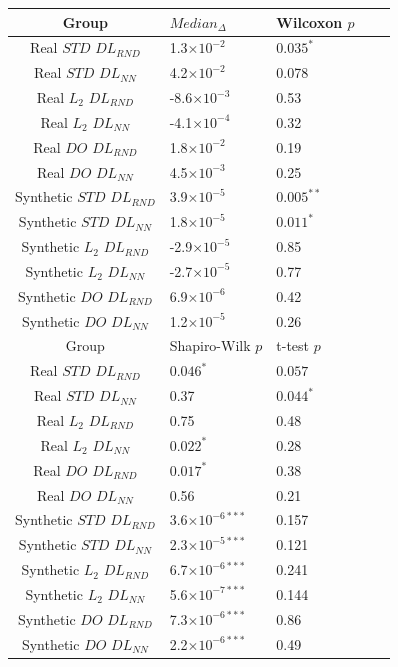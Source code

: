 \documentclass[conference]{IEEEtran}
\begin{document}
\begin{table}[h]
 \begin{center}
 \begin{small}
 \begin{sc}
 \begin{tabular}{c|llll}
 
 \toprule
 Group & $Median_{\Delta}$ & Wilcoxon $p$ \\
 
 \midrule
 Real $STD$ $DL_{RND}$ & 1.3$\times10^{-2}$ & $0.035^{*}$  \\
 Real $STD$ $DL_{NN}$ & 4.2$\times10^{-2}$ & 0.078 \\
 Real $L_2$ $DL_{RND}$ & -8.6$\times10^{-3}$ & 0.53  \\
 Real $L_2$ $DL_{NN}$ & -4.1$\times10^{-4}$ & 0.32  \\
 Real $DO$ $DL_{RND}$ & 1.8$\times10^{-2}$ & 0.19 \\
 Real $DO$ $DL_{NN}$ & 4.5$\times10^{-3}$ & 0.25 \\
 
 \hline
 Synthetic $STD$ $DL_{RND}$ & 3.9$\times10^{-5}$ & $0.005^{**}$ \\
 Synthetic $STD$ $DL_{NN}$ & 1.8$\times10^{-5}$ & $0.011^{*}$  \\
 Synthetic $L_2$ $DL_{RND}$ & -2.9$\times10^{-5}$ & 0.85 \\
 Synthetic $L_2$ $DL_{NN}$ & -2.7$\times10^{-5}$ & 0.77 \\
 Synthetic $DO$ $DL_{RND}$ & 6.9$\times10^{-6}$ & 0.42  \\
 Synthetic $DO$ $DL_{NN}$ & 1.2$\times10^{-5}$ & 0.26  \\
 
 \bottomrule

 
 \toprule
 Group &  Shapiro-Wilk $p$ & t-test $p$\\
 
 \midrule
 Real $STD$ $DL_{RND}$ & $0.046^{*}$ & $0.057$ \\
 Real $STD$ $DL_{NN}$ & 0.37 & $0.044^{*}$\\
 Real $L_2$ $DL_{RND}$ & 0.75 & 0.48 \\
 Real $L_2$ $DL_{NN}$ & $0.022^{*}$ & 0.28 \\
 Real $DO$ $DL_{RND}$ & $0.017^{*}$ & 0.38 \\
 Real $DO$ $DL_{NN}$ & 0.56 & 0.21 \\
 
 \hline
 Synthetic $STD$ $DL_{RND}$ & 3.6$\times10^{-6***}$ & 0.157\\
 Synthetic $STD$ $DL_{NN}$  & 2.3$\times10^{-5***}$ & 0.121 \\
 Synthetic $L_2$ $DL_{RND}$ & 6.7$\times10^{-6***}$ & 0.241\\
 Synthetic $L_2$ $DL_{NN}$ & 5.6$\times10^{-7***}$ & 0.144\\
 Synthetic $DO$ $DL_{RND}$ & 7.3$\times10^{-6***}$ & 0.86 \\
 Synthetic $DO$ $DL_{NN}$ & 2.2$\times10^{-6***}$ & 0.49 \\
 

\end{tabular}
\end{sc}
\end{small}
\end{center}
\end{table}
\end{document}
